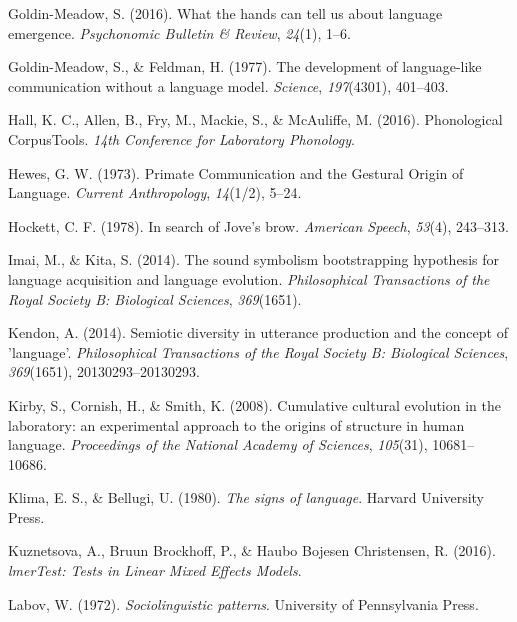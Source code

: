 \documentclass[english,floatsintext,man]{apa6}
\theoremstyle{definition}
\theoremstyle{definition}
\theoremstyle{definition}
\theoremstyle{remark}
\begin{document}
\leavevmode\hypertarget{ref-GoldinMeadow:2016bw}{}%
Goldin-Meadow, S. (2016). What the hands can tell us about language
emergence. \emph{Psychonomic Bulletin \& Review}, \emph{24}(1), 1--6.

\leavevmode\hypertarget{ref-GoldinMeadow:1977gz}{}%
Goldin-Meadow, S., \& Feldman, H. (1977). The development of
language-like communication without a language model. \emph{Science},
\emph{197}(4301), 401--403.

\leavevmode\hypertarget{ref-PCT:1.1}{}%
Hall, K. C., Allen, B., Fry, M., Mackie, S., \& McAuliffe, M. (2016).
Phonological CorpusTools. \emph{14th Conference for Laboratory
Phonology}.

\leavevmode\hypertarget{ref-Hewes:1973vr}{}%
Hewes, G. W. (1973). Primate Communication and the Gestural Origin of
Language. \emph{Current Anthropology}, \emph{14}(1/2), 5--24.

\leavevmode\hypertarget{ref-Hockett:1978se}{}%
Hockett, C. F. (1978). In search of Jove's brow. \emph{American Speech},
\emph{53}(4), 243--313.

\leavevmode\hypertarget{ref-Imai:2014dea}{}%
Imai, M., \& Kita, S. (2014). The sound symbolism bootstrapping
hypothesis for language acquisition and language evolution.
\emph{Philosophical Transactions of the Royal Society B: Biological
Sciences}, \emph{369}(1651).

\leavevmode\hypertarget{ref-Kendon:2014eg}{}%
Kendon, A. (2014). Semiotic diversity in utterance production and the
concept of 'language'. \emph{Philosophical Transactions of the Royal
Society B: Biological Sciences}, \emph{369}(1651), 20130293--20130293.

\leavevmode\hypertarget{ref-Kirby:2008kja}{}%
Kirby, S., Cornish, H., \& Smith, K. (2008). Cumulative cultural
evolution in the laboratory: an experimental approach to the origins of
structure in human language. \emph{Proceedings of the National Academy
of Sciences}, \emph{105}(31), 10681--10686.

\leavevmode\hypertarget{ref-Klima:1980si}{}%
Klima, E. S., \& Bellugi, U. (1980). \emph{The signs of language}.
Harvard University Press.

\leavevmode\hypertarget{ref-lmerTest:2016}{}%
Kuznetsova, A., Bruun Brockhoff, P., \& Haubo Bojesen Christensen, R.
(2016). \emph{lmerTest: Tests in Linear Mixed Effects Models}.

\leavevmode\hypertarget{ref-Labov:1972}{}%
Labov, W. (1972). \emph{Sociolinguistic patterns}. University of
Pennsylvania Press.
\end{document}
